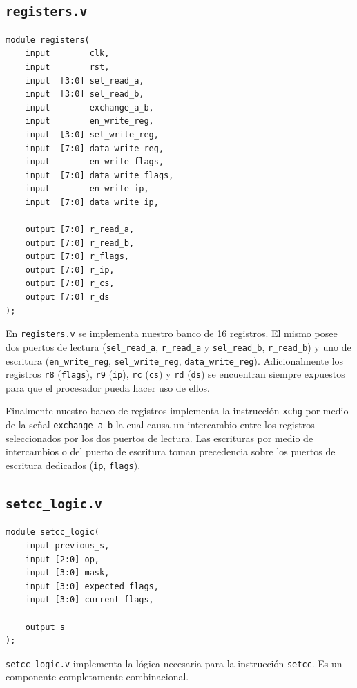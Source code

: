 \documentclass{article}
\begin{document}
\subsection{\texttt{registers.v}}
\begin{verbatim}
module registers(
    input        clk,
    input        rst,
    input  [3:0] sel_read_a,
    input  [3:0] sel_read_b,
    input        exchange_a_b,
    input        en_write_reg,
    input  [3:0] sel_write_reg,
    input  [7:0] data_write_reg,
    input        en_write_flags,
    input  [7:0] data_write_flags,
    input        en_write_ip,
    input  [7:0] data_write_ip,

    output [7:0] r_read_a,
    output [7:0] r_read_b,
    output [7:0] r_flags,
    output [7:0] r_ip,
    output [7:0] r_cs,
    output [7:0] r_ds
);
\end{verbatim}
En \texttt{registers.v} se implementa nuestro banco de 16 registros. El mismo posee dos puertos de lectura (\texttt{sel\_read\_a}, \texttt{r\_read\_a} y \texttt{sel\_read\_b}, \texttt{r\_read\_b}) y uno de escritura (\texttt{en\_write\_reg}, \texttt{sel\_write\_reg}, \texttt{data\_write\_reg}). Adicionalmente los registros \texttt{r8} (\texttt{flags}), \texttt{r9} (\texttt{ip}), \texttt{rc} (\texttt{cs}) y \texttt{rd} (\texttt{ds}) se encuentran siempre expuestos para que el procesador pueda hacer uso de ellos.

Finalmente nuestro banco de registros implementa la instrucción \texttt{xchg} por medio de la señal \texttt{exchange\_a\_b} la cual causa un intercambio entre los registros seleccionados por los dos puertos de lectura. Las escrituras por medio de intercambios o del puerto de escritura toman precedencia sobre los puertos de escritura dedicados (\texttt{ip}, \texttt{flags}).

\subsection{\texttt{setcc\_logic.v}}
\begin{verbatim}
module setcc_logic(
    input previous_s,
    input [2:0] op,
    input [3:0] mask,
    input [3:0] expected_flags,
    input [3:0] current_flags,

    output s
);
\end{verbatim}
\texttt{setcc\_logic.v} implementa la lógica necesaria para la instrucción \texttt{setcc}. Es un componente completamente combinacional.
\end{document}
